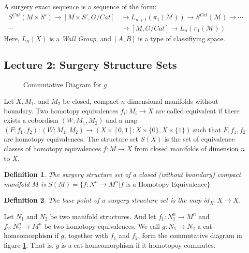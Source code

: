 \documentclass[oneside]{book}
\theoremstyle{mystyle}
\newtheorem{definition}{Definition}[section]
\begin{document}
A surgery exact sequence is a sequence of the form:
\begin{align*}
    S^{Cat}(M\times S') \rightarrow [M\times S',G/Cat] &\rightarrow L_{n+1}(\pi_{1}(\mathcal{M})) \rightarrow S^{Cat}(\mathcal{M}) \rightarrow \cdots\\
    \cdots &\rightarrow [M,G/Cat] \rightarrow L_{n}(\pi_{1}(\mathcal{M}))
\end{align*}
Here, $L_{n}(X)$ is a \textit{Wall Group}, and $[A,B]$ is a type of classifiying space.
\subsection{Lecture 2: Surgery Structure Sets}
\begin{figure}
\vspace{-6ex}
\centering
{}
\caption[Surgery Theory Commutative Diagram]{Commutative Diagram for $g$}
\label{fig:wellesley_surgery_theory_commutative_diagram_for_g_for_two_homotopy_equivalences}
\end{figure}
Let $X,M_{1}$, and $M_{2}$ be closed, compact $n$-dimensional manifolds without boundary. Two homotopy equivalences $f_{i}:M_{i}\rightarrow X$ are called equivalent if there exists a cobordism $(W;M_{1},M_{2})$ and a map $(F;f_{1},f_{2}):(W;M_{1},M_{2})\rightarrow (X\times [0,1];X\times \{0\},X\times\{1\})$ such that $F,f_{1},f_{2}$ are homotopy equivalences. The structure set $S(X)$ is the set of equivalence classes of homotopy equivalences $f:M\rightarrow X$ from closed manifolds of dimension $n$ to $X$.\hfill
\begin{definition}
The surgery structure set of a closed (without boundary) compact manifold $M$ is $S(M) = \{f:N^{n}\rightarrow M^{n}|f\textrm{ is a Homotopy Equivalence}\}$
\end{definition}
\begin{definition}
The base point of a surgery structure set is the map $id_{X}:X\rightarrow X$.
\end{definition}
Let $N_{1}$ and $N_{2}$ be two manifold structures. And let $f_{1}:N_{1}^{n}\rightarrow M^{n}$ and $f_{2}:N_{2}^{n}\rightarrow M^{n}$ be two homotopy equivalences. We call $g:N_{1}\rightarrow N_{2}$ a cat-homeomorphism if $g$, together with $f_{1}$ and $f_{2}$, form the commutative diagram in figure \ref{fig:wellesley_surgery_theory_commutative_diagram_for_g_for_two_homotopy_equivalences}. That is, $g$ is a cat-homeomorphism if it homotopoy commutes.
\end{document}
